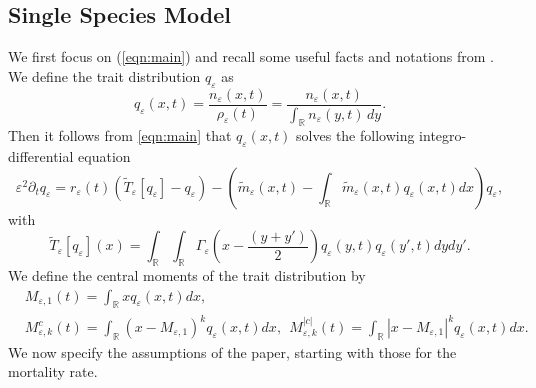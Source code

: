 \documentclass[]{article}
\theoremstyle{remark}
\begin{document}
\subsection{Single Species Model}
We first focus on (\ref{eqn:main}) and recall some useful facts and notations from \cite{GHM}. We define the trait distribution $q_\varepsilon$ as
\begin{equation}
\label{eq: qeps}
q_\varepsilon(x,t)=\frac{n_\varepsilon(x,t)}{\rho_\varepsilon(t)}=\frac{n_\varepsilon(x,t)}{\int_{\mathbb{R}}n_\varepsilon(y,t)\,dy}.
\end{equation}
Then it follows from \eqref{eqn:main} that $q_\varepsilon(x,t)$ solves the following integro-differential equation
\begin{equation} \label{eqn:distribution}
\varepsilon^2 \partial_t q_\varepsilon = r_\varepsilon(t) \left(\widetilde T_{\varepsilon}[q_\varepsilon] - q_\varepsilon \right) 
-  \left( \tilde{m}_{\varepsilon}(x,t)  - \int_{\mathbb R}  \tilde{m}_{\varepsilon}(x,t)q_\varepsilon(x,t) dx \right) q_\varepsilon ,
\end{equation}
with
\[
\widetilde T_{\varepsilon}[q_\varepsilon](x) =  \int_{\mathbb R} \int_{\mathbb R} \Gamma_\varepsilon \left(x-\frac{(y+y')}{2}\right) q_\varepsilon(y,t)q_\varepsilon(y',t) dydy'.
\]
We define the central moments of the trait distribution by
\begin{subequations}
\label{eq: central moments}
    \begin{align}
   &M_{\varepsilon,1}(t)=\int_{\mathbb{R}}xq_\varepsilon(x,t)dx,\\
    &M_{\varepsilon,k}^c(t)=\int_{\mathbb{R}}(x-M_{\varepsilon,1})^kq_\varepsilon(x,t)dx,~~    M_{\varepsilon,k}^{|c|}(t)=\int_{\mathbb{R}}|x-M_{\varepsilon,1}|^kq_\varepsilon(x,t)dx.
\end{align}
\end{subequations}
We now specify the assumptions of the paper, starting with those for the mortality rate.
\end{document}
